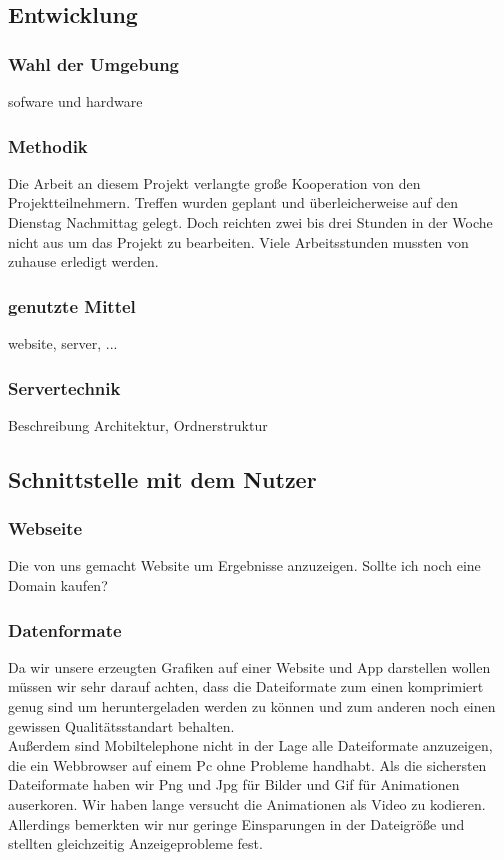\documentclass[a4paper,oneside,10pt,titlepage]{article}
\begin{document}
\subsection{Entwicklung}
\subsubsection{Wahl der Umgebung}
sofware und hardware
\subsubsection{Methodik}
Die Arbeit an diesem Projekt verlangte große Kooperation von den Projektteilnehmern. Treffen wurden geplant und überleicherweise auf den Dienstag Nachmittag gelegt. Doch reichten zwei bis drei Stunden in der Woche nicht aus um das Projekt zu bearbeiten. Viele Arbeitsstunden mussten von zuhause erledigt werden.
\subsubsection{genutzte Mittel}
website, server, ...
\subsubsection{Servertechnik}
Beschreibung Architektur, Ordnerstruktur
\subsection{Schnittstelle mit dem Nutzer}
\subsubsection{Webseite}
Die von uns gemacht Website um Ergebnisse anzuzeigen. Sollte ich noch eine Domain kaufen?
\subsubsection{Datenformate}
Da wir unsere erzeugten Grafiken auf einer Website und App darstellen wollen müssen wir sehr darauf achten, dass die Dateiformate zum einen komprimiert genug sind um heruntergeladen werden zu können und zum anderen noch einen gewissen Qualitätsstandart behalten.\\
Außerdem sind Mobiltelephone nicht in der Lage alle Dateiformate anzuzeigen, die ein Webbrowser auf einem Pc ohne Probleme handhabt. Als die sichersten Dateiformate haben wir Png und Jpg für Bilder und Gif für Animationen auserkoren. Wir haben lange versucht die Animationen als Video zu kodieren. Allerdings bemerkten wir nur geringe Einsparungen in der Dateigröße und stellten gleichzeitig Anzeigeprobleme fest.
\end{document}
